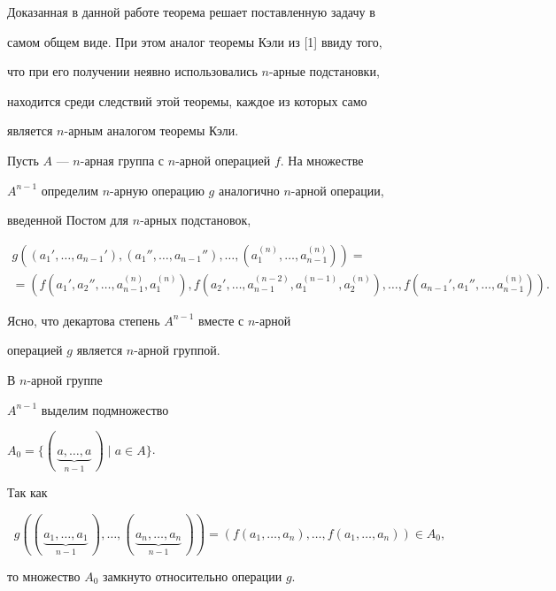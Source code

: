 Доказанная в данной работе теорема решает поставленную задачу в


самом общем виде. При этом аналог теоремы Кэли из [1] ввиду того,


что при его получении неявно использовались $n$-арные подстановки,


находится среди следствий этой теоремы, каждое из которых само


является $n$-арным аналогом теоремы Кэли.





Пусть $A$ --- $n$-арная группа с $n$-арной операцией $f$. На множестве


$A^{n-1}$ определим $n$-арную операцию $g$ аналогично $n$-арной операции,


введенной Постом для $n$-арных подстановок,


\begin{multline*}


g((a_1',\dotsc,a_{n-1}'),(a_1'',\dotsc,a_{n-1}''),\dotsc,


(a_1^{(n)},\dotsc,a_{n-1}^{(n)}))= \\


%


=(f(a_1',a_2'',\dotsc,a_{n-1}^{(n)},a_1^{(n)}),


f(a_2',\dotsc,a_{n-1}^{(n-2)},a_1^{(n-1)},a_2^{(n)}),\dotsc,


f(a_{n-1}',a_1'',\dotsc,a_{n-1}^{(n)})).


\end{multline*}





Ясно, что декартова степень $A^{n-1}$ вместе с $n$-арной


операцией $g$ является $n$-арной группой.


В $n$-арной группе


$A^{n-1}$ выделим подмножество


$A_0=\{(\,\underbrace{a,\dotsc,a}_{n-1}\,)\mid a\in A\}$.


Так как


$$


g((\,\underbrace{a_1,\dotsc,a_1}_{n-1}\,),\dotsc,


(\,\underbrace{a_n,\dotsc,a_n}_{n-1}\,))=


(f(a_1,\dotsc,a_n),\dotsc,f(a_1,\dotsc,a_n))\in A_0,


$$


то множество $A_0$ замкнуто относительно операции $g$.





